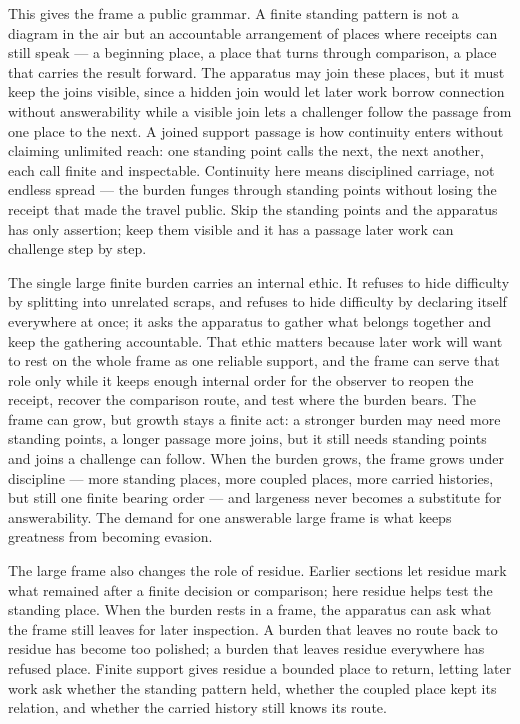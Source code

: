 This gives the frame a public grammar. A finite standing pattern is not a diagram in the air but an accountable arrangement of places where receipts can still speak --- a beginning place, a place that turns through comparison, a place that carries the result forward. The apparatus may join these places, but it must keep the joins visible, since a hidden join would let later work borrow connection without answerability while a visible join lets a challenger follow the passage from one place to the next. A joined support passage is how continuity enters without claiming unlimited reach: one standing point calls the next, the next another, each call finite and inspectable. Continuity here means disciplined carriage, not endless spread --- the burden funges through standing points without losing the receipt that made the travel public. Skip the standing points and the apparatus has only assertion; keep them visible and it has a passage later work can challenge step by step.

The single large finite burden carries an internal ethic. It refuses to hide difficulty by splitting into unrelated scraps, and refuses to hide difficulty by declaring itself everywhere at once; it asks the apparatus to gather what belongs together and keep the gathering accountable. That ethic matters because later work will want to rest on the whole frame as one reliable support, and the frame can serve that role only while it keeps enough internal order for the observer to reopen the receipt, recover the comparison route, and test where the burden bears. The frame can grow, but growth stays a finite act: a stronger burden may need more standing points, a longer passage more joins, but it still needs standing points and joins a challenge can follow. When the burden grows, the frame grows under discipline --- more standing places, more coupled places, more carried histories, but still one finite bearing order --- and largeness never becomes a substitute for answerability. The demand for one answerable large frame is what keeps greatness from becoming evasion.

The large frame also changes the role of residue. Earlier sections let residue mark what remained after a finite decision or comparison; here residue helps test the standing place. When the burden rests in a frame, the apparatus can ask what the frame still leaves for later inspection. A burden that leaves no route back to residue has become too polished; a burden that leaves residue everywhere has refused place. Finite support gives residue a bounded place to return, letting later work ask whether the standing pattern held, whether the coupled place kept its relation, and whether the carried history still knows its route.

